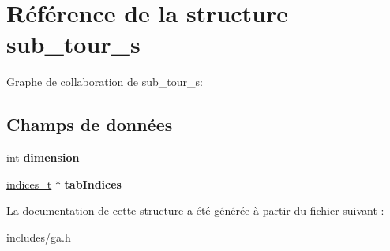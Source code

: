 \hypertarget{structsub__tour__s}{}\section{Référence de la structure sub\+\_\+tour\+\_\+s}
\label{structsub__tour__s}


Graphe de collaboration de sub\+\_\+tour\+\_\+s\+:
\subsection*{Champs de données}
\begin{DoxyCompactItemize}
\item 
\mbox{\label{structsub__tour__s_ab0e56051417f0b69509f6411ab6adc2e}} 
int {\bfseries dimension}
\item 
\mbox{\label{structsub__tour__s_a601fc6f4c35c19c023e38536206647a2}} 
\hyperlink{structindices__s}{indices\+\_\+t} $\ast$ {\bfseries tab\+Indices}
\end{DoxyCompactItemize}


La documentation de cette structure a été générée à partir du fichier suivant \+:\begin{DoxyCompactItemize}
\item 
includes/ga.\+h\end{DoxyCompactItemize}
